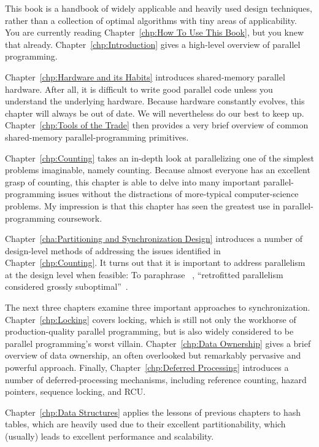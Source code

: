 This book is a handbook of widely applicable and heavily
used design techniques, rather than
a collection of optimal algorithms with tiny areas of applicability.
You are currently reading Chapter~\ref{chp:How To Use This Book}, but
you knew that already.
Chapter~\ref{chp:Introduction} gives a high-level overview of parallel
programming.

Chapter~\ref{chp:Hardware and its Habits} introduces shared-memory
parallel hardware.
After all, it is difficult to write good parallel code unless you
understand the underlying hardware.
Because hardware constantly evolves, this chapter will always be
out of date.
We will nevertheless do our best to keep up.
Chapter~\ref{chp:Tools of the Trade} then provides a very brief overview
of common shared-memory parallel-programming primitives.

Chapter~\ref{chp:Counting} takes an in-depth look at parallelizing
one of the simplest problems imaginable, namely counting.
Because almost everyone has an excellent grasp of counting, this chapter
is able to delve into many important parallel-programming issues without
the distractions of more-typical computer-science problems.
My impression is that this chapter has seen the greatest use in
parallel-programming coursework.

Chapter~\ref{cha:Partitioning and Synchronization Design}
introduces a number of design-level methods of addressing the issues
identified in Chapter~\ref{chp:Counting}.
It turns out that it is important to address parallelism at
the design level when feasible:
To paraphrase ~\cite{Dijkstra:1968:LEG:362929.362947},
``retrofitted parallelism considered grossly
suboptimal''~\cite{PaulEMcKenney2012HOTPARsuboptimal}.

The next three chapters examine three important approaches to
synchronization.
Chapter~\ref{chp:Locking} covers locking, which is still not only the
workhorse of production-quality parallel programming, but is also widely
considered to be parallel programming's worst villain.
Chapter~\ref{chp:Data Ownership} gives a brief overview of data ownership,
an often overlooked but remarkably pervasive and powerful approach.
Finally, Chapter~\ref{chp:Deferred Processing} introduces a number of
deferred-processing mechanisms, including reference counting,
hazard pointers, sequence locking, and RCU.

Chapter~\ref{chp:Data Structures} applies the lessons of previous
chapters to hash tables, which are heavily used due
to their excellent partitionability, which (usually) leads to excellent
performance and scalability.

